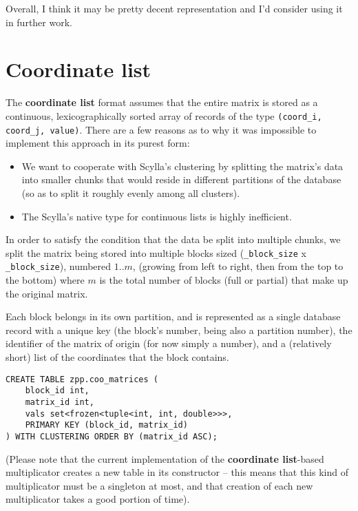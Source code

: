 \documentclass{article}
\newcommand{\code}[0]{\texttt}
\begin{document}
Overall, I think it may be pretty decent representation and I'd consider using it in further work.
\pagebreak
\section{Coordinate list}

The \textbf{coordinate list} format assumes that the entire matrix is stored as a continuous, lexicographically sorted array of records of the type \code{(coord\_i, coord\_j, value)}. There are a few reasons as to why it was impossible to implement this approach in its purest form:

\begin{itemize}
\item We want to cooperate with Scylla's clustering by splitting the matrix's data into smaller chunks that would reside in different partitions of the database (so as to split it roughly evenly among all clusters).
\item The Scylla's native type for continuous lists is highly inefficient.
\end{itemize}

In order to satisfy the condition that the data be split into multiple chunks, we split the matrix being stored into multiple blocks sized (\code{\_block\_size} x \code{\_block\_size}), numbered $1..m$, (growing from left to right, then from the top to the bottom) where $m$ is the total number of blocks (full or partial) that make up the original matrix. 

Each block belongs in its own partition, and is represented as a single database record with a unique key (the block's number, being also a partition number), the identifier of the matrix of origin (for now simply a number), and a (relatively short) list of the coordinates that the block contains.

\begin{lstlisting}[style=SQLStyle]
CREATE TABLE zpp.coo_matrices (
    block_id int, 
    matrix_id int, 
    vals set<frozen<tuple<int, int, double>>>, 
    PRIMARY KEY (block_id, matrix_id) 
) WITH CLUSTERING ORDER BY (matrix_id ASC);
\end{lstlisting}

(Please note that the current implementation of the \textbf{coordinate list}-based multiplicator creates a new table in its constructor -- this means that this kind of multiplicator must be a singleton at most, and that creation of each new multiplicator takes a good portion of time).
\end{document}
